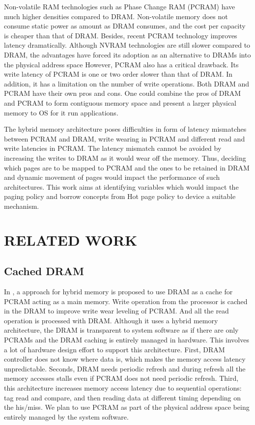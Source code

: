 \documentclass[a4paper, 11pt, conference]{ieeeconf}      %
\begin{document}
	Non-volatile RAM technologies such as Phase Change RAM (PCRAM) have much higher densities compared to DRAM.  Non-volatile memory does not consume static power as amount as DRAM consumes, and the cost per capacity is cheaper than that of DRAM.  Besides, recent PCRAM technology improves latency dramatically. Although NVRAM technologies are still slower compared to DRAM, the advantages have forced its adoption as an alternative to DRAMs  into the physical address space  However, PCRAM also has a critical drawback.  Its write latency of PCRAM is one or two order slower than that of DRAM.  In addition, it has a limitation on the number of write operations. Both DRAM and PCRAM have their own pros and cons. One could combine the pros of DRAM and PCRAM to form contiguous memory space and present a larger physical memory to OS for it run applications.

	The hybrid memory architecture poses difficulties in form of latency mismatches between PCRAM and DRAM, write wearing in PCRAM and different read and write latencies in PCRAM. The latency mismatch cannot be avoided by increasing the writes to DRAM as it would wear off the memory. Thus, deciding which pages are to be mapped to PCRAM and the ones to be retained in DRAM and dynamic movement of pages would impact the performance of such architectures. This work aims at identifying variables which would impact the paging policy and borrow concepts from Hot page policy \cite{meswani2015heterogeneous} to device a suitable mechanism.

\section{RELATED WORK} \vspace{2mm}
\subsection{Cached DRAM} \vspace{1mm}
	In \cite{qureshi2009scalable}, a approach for hybrid memory is proposed to use DRAM as a cache for PCRAM acting as a main memory.  Write operation from the processor is cached in the DRAM to improve write wear leveling of PCRAM. And all the read operation is processed with DRAM.  Although it uses a hybrid memory architecture, the DRAM is transparent to system software as if there are only PCRAMs and the DRAM caching is entirely managed in hardware. This involves a lot of hardware design effort to support this architecture. First, DRAM controller does not know where data is, which makes the memory access latency unpredictable. Seconds, DRAM needs periodic refresh and during refresh all the memory accesses stalls even if PCRAM does not need periodic refresh. Third, this architecture increases memory access latency due to sequential operations: tag read and compare, and then reading data at different timing depending on the his/miss. We plan to use PCRAM as part of the physical address space being entirely managed by the system software.
\end{document}
